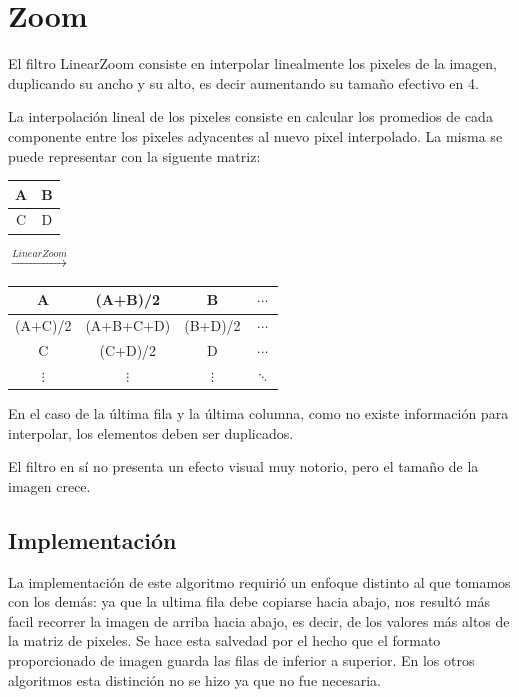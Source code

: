 \section{Zoom}

El filtro LinearZoom consiste en interpolar linealmente los pixeles de la imagen, duplicando su ancho y su alto, es decir aumentando su tamaño efectivo en 4.

La interpolación lineal de los pixeles consiste en calcular los promedios de cada componente entre los pixeles adyacentes al nuevo pixel interpolado. La misma se puede representar con la siguente matriz:

\begin{table}[H]
\centering
  \begin{tabular}{ | c | c | }
    \hline
    A & B \\ \hline
    C & D \\
    \hline
  \end{tabular}
{\LARGE$\xrightarrow{LinearZoom}$}
  \begin{tabular}{ | c | c | c | c |}
    \hline
    A & (A+B)/2 & B & $\cdots$ \\ \hline
    (A+C)/2 & (A+B+C+D) & (B+D)/2 & $\cdots$ \\ \hline
    C & (C+D)/2 & D & $\cdots$ \\ \hline
    $\vdots$ & $\vdots$ & $\vdots$ & $\ddots$ \\
    \hline
  \end{tabular}
\end{table}

En el caso de la última fila y la última columna, como no existe información para interpolar, los elementos deben ser duplicados.

El filtro en sí no presenta un efecto visual muy notorio, pero el tamaño de la imagen crece.

\subsection{Implementación}

La implementación de este algoritmo requirió un enfoque distinto al que tomamos con los demás: ya que la ultima fila debe copiarse hacia abajo, nos resultó más facil recorrer la imagen de arriba hacia abajo, es decir, de los valores más altos de la matriz de pixeles. Se hace esta salvedad por el hecho que el formato proporcionado de imagen guarda las filas de inferior a superior. En los otros algoritmos esta distinción no se hizo ya que no fue necesaria.

